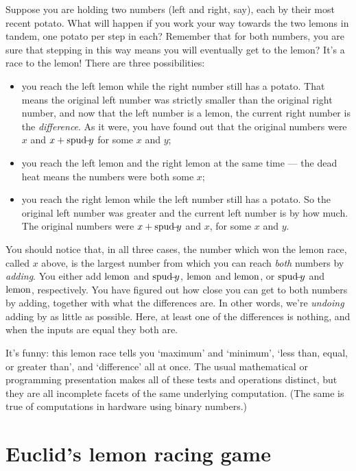 \documentclass{book}
\begin{document}
Suppose you are holding two numbers (left and right, say), each by their most recent potato. What will happen if you work your way towards the two lemons in tandem, one potato per step in each? Remember that for both numbers, you are sure that stepping in this way means you will eventually get to the lemon? It's a race to the lemon! There are three possibilities:
\begin{itemize}
\item you reach the left lemon while the right number still has a potato. That means the original left number was strictly smaller than the original right number, and now that the left number is a lemon, the current right number is the \emph{difference}. As it were, you have found out that the original numbers were $x$ and $x+\mbox{spud}\!\!\!-\!\!\! y$ for some $x$ and $y$;
\item you reach the left lemon and the right lemon at the same time --- the dead heat means the numbers were both some $x$;
\item you reach the right lemon while the left number still has a potato. So the original left number was greater and the current left number is by how much. The original numbers were $x+\mbox{spud}\!\!\!-\!\!\! y$ and $x$, for some $x$ and $y$.
\end{itemize}

You should notice that, in all three cases, the number which won the lemon race, called $x$ above, is the largest number from which you can reach \emph{both} numbers by \emph{adding}. You either add $\mbox{lemon}$ and $\mbox{spud}\!\!\!-\!\!\! y$, $\mbox{lemon}$ and $\mbox{lemon}$, or $\mbox{spud}\!\!\!-\!\!\! y$ and $\mbox{lemon}$, respectively. You have figured out how close you can get to both numbers by adding, together with what the differences are. In other words, we're \emph{undoing} adding by as little as possible. Here, at least one of the differences is nothing, and when the inputs are equal they both are.

It's funny: this lemon race tells you `maximum' and `minimum', `less than, equal, or greater than', and `difference' all at once. The usual mathematical or programming presentation makes all of these tests and operations distinct, but they are all incomplete facets of the same underlying computation. (The same is true of computations in hardware using binary numbers.)



\section{Euclid's lemon racing game}
\end{document}
